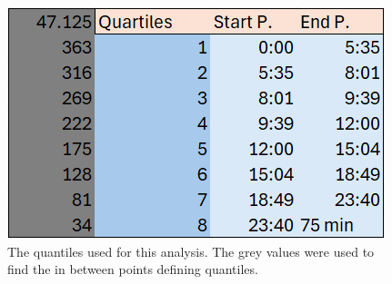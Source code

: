 \documentclass[letterpaper,twocolumn,amsmath,amssymb,prl,nolongbibliography,url,reprint]{revtex4-2}
\begin{document}
\begin{figure}
\includegraphics[width=1\linewidth]{quartiles.png}
\caption{\label{fg:ret} The quantiles used for this analysis. The grey values were used to find the in between points defining quantiles.
}
\end{figure}
\end{document}
